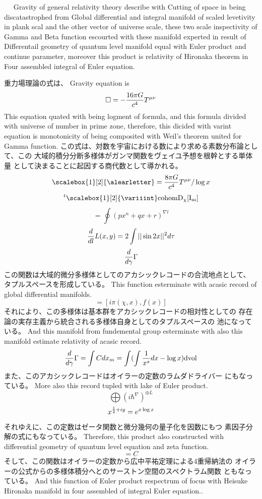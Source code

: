 \documentclass{jsarticle}
\begin{document}
{  　 Gravity of general relativity theory describe with Cutting of space
in being discatastrophed from Global differential and integral manifold
of scaled levetivity in plank scal and the other vector of universe
scale, these two scale inspectivity of Gamma and Beta function escourted
with these manifold experted in result of Differentail geometry of
quantum level manifold equal with Euler product and continue parameter,
moreover this product is relativity of Hironaka theorem in Four assembled
integral of Euler equation.

 重力場理論の式は、
  Gravity equation is
  $$ \square = - {16 \pi G \over c^4}T^{\mu\nu} $$
  This equation quated with being logment of formula, and
  this formula divided with universe of number in prime zone,
  therefore, this dicided with varint equation is monotonicity of
  being composited with Weil's theorem united for Gamma function.
  この式は、対数を宇宙における数により求める素数分布論として、この
  大域的積分分断多様体がガンマ関数をヴェイユ予想を根幹とする単体量
  として決まることに起因する商代数として導かれる。
  $$ \scalebox{1}[2]{\alearletter} = 
  {{{{8 \pi G} \over {c^4}}T^{\mu\nu}}/ \log x} $$
  $$ {}^{t}\scalebox{1}[2]{\variiint}\mathrm{cohom D_{\chi}[I_m]}$$
  $$ = \oint {(px^n + qx + r)^{\nabla l}} $$
  $$ {d \over d l}L(x,y) = 2 \int ||\sin 2x||^{2}d \tau $$
  $$ {d \over d \gamma}\Gamma $$
  この関数は大域的微分多様体としてのアカシックレコードの合流地点として、
  タプルスペースを形成している。
  This function esterminate with acasic record of global differential
  manifolds.
  $$ = [i \pi (\chi, x), f(x)] $$
  それにより、この多様体は基本群をアカシックレコードの相対性としての
  存在論の実存主義から統合される多様体自身としてのタプルスペースの
  池になっている。
  And this manifold from fundemental group esterminate with
  also this manifold estimate relativity of acasic record.
  $$ {d \over d \gamma}\Gamma = \int C dx_m = \int(\int {1 \over x^s}dx
  - \log x)\mathrm{dvol} $$
  また、このアカシックレコードはオイラーの定数のラムダドライバー
  にもなっている。
  More also this record tupled with lake of Euler product.
  $$ \bigoplus({i \hbar^{\nabla}})^{\oplus L} $$
  $$ x^{{1 \over 2} + iy} = e^{x \log x} $$
  それゆえに、この定数はゼータ関数と微分幾何の量子化を因数にもつ
  素因子分解の式にもなっている。
  Therefore, this product also constructed with differential geometry
  of quantum level equation and zeta function.
  $$ = C $$ 
  そして、この関数はオイラーの定数から広中平祐定理による4重帰納法の
  オイラーの公式からの多様体積分へとのサーストン空間のスペクトラム関数
  ともなっている。
  And this function of Euler product respectrum of focus with
  Heisuke Hironaka manifold in four assembled of integral Euler equation.. 

}
\end{document}
